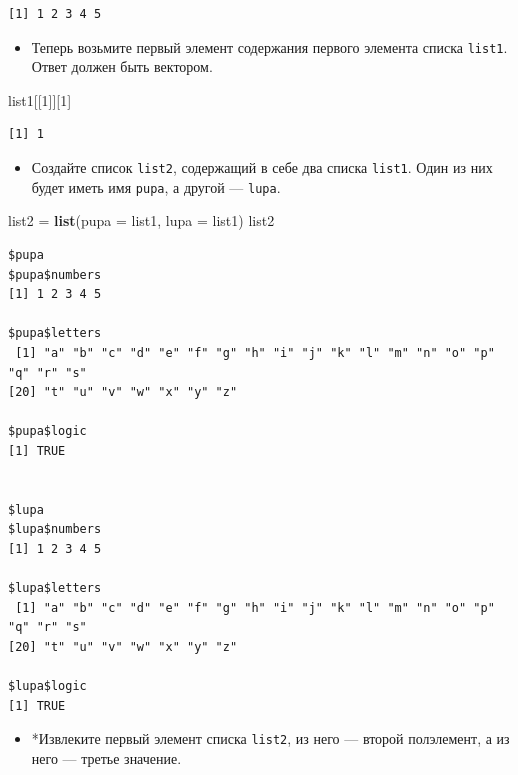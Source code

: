 \documentclass[
]{book}
\newenvironment{Shaded}{\begin{snugshade}}{\end{snugshade}}
\newcommand{\DataTypeTok}[1]{\textcolor[rgb]{0.13,0.29,0.53}{#1}}
\newcommand{\DecValTok}[1]{\textcolor[rgb]{0.00,0.00,0.81}{#1}}
\newcommand{\KeywordTok}[1]{\textcolor[rgb]{0.13,0.29,0.53}{\textbf{#1}}}
\newcommand{\NormalTok}[1]{#1}
\newcommand{\StringTok}[1]{\textcolor[rgb]{0.31,0.60,0.02}{#1}}
\providecommand{\tightlist}{%
  \setlength{\itemsep}{0pt}\setlength{\parskip}{0pt}}
\begin{document}
\begin{verbatim}
[1] 1 2 3 4 5
\end{verbatim}

\begin{itemize}
\tightlist
\item
  Теперь возьмите первый элемент содержания первого элемента списка \texttt{list1}. Ответ должен быть вектором.
\end{itemize}

\begin{Shaded}
\begin{Highlighting}[]
\NormalTok{list1[[}\DecValTok{1}\NormalTok{]][}\DecValTok{1}\NormalTok{]}
\end{Highlighting}
\end{Shaded}

\begin{verbatim}
[1] 1
\end{verbatim}

\begin{itemize}
\tightlist
\item
  Создайте список \texttt{list2}, содержащий в себе два списка \texttt{list1}. Один из них будет иметь имя \texttt{pupa}, а другой --- \texttt{lupa}.
\end{itemize}

\begin{Shaded}
\begin{Highlighting}[]
\NormalTok{list2 =}\StringTok{ }\KeywordTok{list}\NormalTok{(}\DataTypeTok{pupa =}\NormalTok{ list1, }\DataTypeTok{lupa =}\NormalTok{ list1)}
\NormalTok{list2}
\end{Highlighting}
\end{Shaded}

\begin{verbatim}
$pupa
$pupa$numbers
[1] 1 2 3 4 5

$pupa$letters
 [1] "a" "b" "c" "d" "e" "f" "g" "h" "i" "j" "k" "l" "m" "n" "o" "p" "q" "r" "s"
[20] "t" "u" "v" "w" "x" "y" "z"

$pupa$logic
[1] TRUE


$lupa
$lupa$numbers
[1] 1 2 3 4 5

$lupa$letters
 [1] "a" "b" "c" "d" "e" "f" "g" "h" "i" "j" "k" "l" "m" "n" "o" "p" "q" "r" "s"
[20] "t" "u" "v" "w" "x" "y" "z"

$lupa$logic
[1] TRUE
\end{verbatim}

\begin{itemize}
\tightlist
\item
  *Извлеките первый элемент списка \texttt{list2}, из него --- второй полэлемент, а из него --- третье значение.
\end{itemize}
\end{document}
